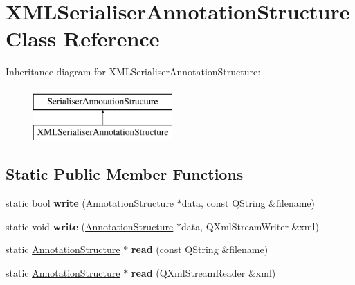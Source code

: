 \hypertarget{class_x_m_l_serialiser_annotation_structure}{}\section{X\+M\+L\+Serialiser\+Annotation\+Structure Class Reference}
\label{class_x_m_l_serialiser_annotation_structure}
Inheritance diagram for X\+M\+L\+Serialiser\+Annotation\+Structure\+:\begin{figure}[H]
\begin{center}
\leavevmode
\includegraphics[height=2.000000cm]{class_x_m_l_serialiser_annotation_structure}
\end{center}
\end{figure}
\subsection*{Static Public Member Functions}
\begin{DoxyCompactItemize}
\item 
\mbox{\label{class_x_m_l_serialiser_annotation_structure_ad89423cbf02039148da05c4bc3c6c95e}} 
static bool {\bfseries write} (\hyperlink{class_annotation_structure}{Annotation\+Structure} $\ast$data, const Q\+String \&filename)
\item 
\mbox{\label{class_x_m_l_serialiser_annotation_structure_a91ee4508b5c6cb2ce3905788415543f0}} 
static void {\bfseries write} (\hyperlink{class_annotation_structure}{Annotation\+Structure} $\ast$data, Q\+Xml\+Stream\+Writer \&xml)
\item 
\mbox{\label{class_x_m_l_serialiser_annotation_structure_a14d5d78b351a22f30e5781b8fca91575}} 
static \hyperlink{class_annotation_structure}{Annotation\+Structure} $\ast$ {\bfseries read} (const Q\+String \&filename)
\item 
\mbox{\label{class_x_m_l_serialiser_annotation_structure_a42cf4c385f006fc5c7205454bdc02be3}} 
static \hyperlink{class_annotation_structure}{Annotation\+Structure} $\ast$ {\bfseries read} (Q\+Xml\+Stream\+Reader \&xml)
\end{DoxyCompactItemize}
